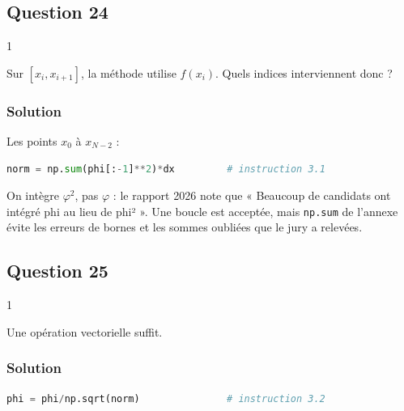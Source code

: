\documentclass[11pt,a4paper]{article}
\begin{document}
\hypertarget{question-24}{%
\subsection{Question 24}\label{question-24}}

\begin{indication}{1}

Sur \([x_i,x_{i+1}]\), la méthode utilise \(f(x_i)\). Quels indices interviennent donc ?

\end{indication}

\hypertarget{solution-23}{%
\subsubsection{Solution}\label{solution-23}}

Les points \(x_0\) à \(x_{N-2}\) :

\begin{lstlisting}[language=Python]
    norm = np.sum(phi[:-1]**2)*dx         # instruction 3.1
\end{lstlisting}

\begin{piege}

On intègre \(\varphi^2\), pas \(\varphi\) : le rapport 2026 note que « Beaucoup de candidats ont intégré phi au lieu de phi² ». Une boucle est acceptée, mais \texttt{np.sum} de l'annexe évite les erreurs de bornes et les sommes oubliées que le jury a relevées.

\end{piege}

\hypertarget{question-25}{%
\subsection{Question 25}\label{question-25}}

\begin{indication}{1}

Une opération vectorielle suffit.

\end{indication}

\hypertarget{solution-24}{%
\subsubsection{Solution}\label{solution-24}}

\begin{lstlisting}[language=Python]
    phi = phi/np.sqrt(norm)               # instruction 3.2
\end{lstlisting}
\end{document}
